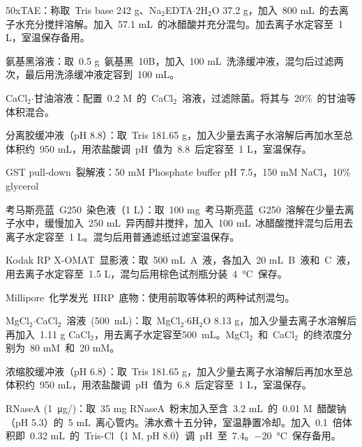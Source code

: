 \begin{compactitem}[\FourClowerSolid]
\vspace{2ex}
\item 50xTAE：称取\ Tris base 242 g、Na$_2$EDTA$\cdot$2H$_2$O 37.2 g，加入\ 800 mL\ 的去离子水充分搅拌溶解。加入\ 57.1 mL\ 的冰醋酸并充分混匀。加去离子水定容至\ 1 L，室温保存备用。
\vspace{2ex}
\item 氨基黑溶液：取\ 0.5 g\ 氨基黑\ 10B，加入\ 100 mL\ 洗涤缓冲液，混匀后过滤两次，最后用洗涤缓冲液定容到\ 100 mL。
\vspace{2ex}
\item CaCl$_2$$\cdot$甘油溶液：配置\ 0.2 M\ 的\ CaCl$_2$\ 溶液，过滤除菌。将其与\ 20\%\ 的甘油等体积混合。
\vspace{2ex}
\item 分离胶缓冲液（pH 8.8）：取\ Tris 181.65 g，加入少量去离子水溶解后再加水至总体积约\ 950 mL，用浓盐酸调\ pH\ 值为\ 8.8\ 后定容至\ 1 L，室温保存。
\vspace{2ex}
\item GST pull-down\ 裂解液：50 mM Phosphate buffer pH 7.5，150 mM NaCl，10\% glycerol
\vspace{2ex}
\item 考马斯亮蓝\ G250\ 染色液（1 L）：取\ 100 mg\ 考马斯亮蓝\ G250\ 溶解在少量去离子水中，缓慢加入\ 250 mL\ 异丙醇并搅拌，加入\ 100 mL\ 冰醋酸搅拌混匀后用去离子水定容至\ 1 L。混匀后用普通滤纸过滤室温保存。
\vspace{2ex}
\item Kodak RP X-OMAT\ 显影液：取\ 500 mL\ A\ 液，各加入\ 20 mL\ B\ 液和\ C\ 液，用去离子水定容至\ 1.5 L，混匀后用棕色试剂瓶分装\ \SI{4}{\degreeCelsius}\ 保存。
\vspace{2ex}
\item Millipore\ 化学发光\ HRP\ 底物：使用前取等体积的两种试剂混匀。
\vspace{2ex}
\item MgCl$_2$$\cdot$CaCl$_2$\ 溶液\ (\SI{500}{\mL})：取\ MgCl$_2$$\cdot$6H$_2$O 8.13 g，加入少量去离子水溶解后再加入\ 1.11 g CaCl$_2$，用去离子水定容至\SI{500}{\mL}。MgCl$_2$\ 和\ CaCl$_2$\ 的终浓度分别为\ 80 mM\ 和\ 20 mM。
\vspace{2ex}
\item 浓缩胶缓冲液（pH 6.8）：取\ Tris 181.65 g，加入少量去离子水溶解后再加水至总体积约\ 950 mL，用浓盐酸调\ pH\ 值为\ 6.8\ 后定容至\ 1 L，室温保存。
\vspace{2ex}
\item RNaseA (\SI{1}{\ug}/\uL)：取\ 35 mg RNaseA\ 粉末加入至含\ 3.2 mL\ 的\ 0.01 M\ 醋酸钠（pH 5.3）的\ 5 mL\ 离心管内。沸水煮十五分钟，室温静置冷却。加入\ 0.1\ 倍体积即\ 0.32 mL\ 的\ Tris-Cl（1 M, pH 8.0）调\ pH\ 至\ 7.4。\SI{-20}{\degreeCelsius}\ 保存备用。
$$
\end{compactitem}
